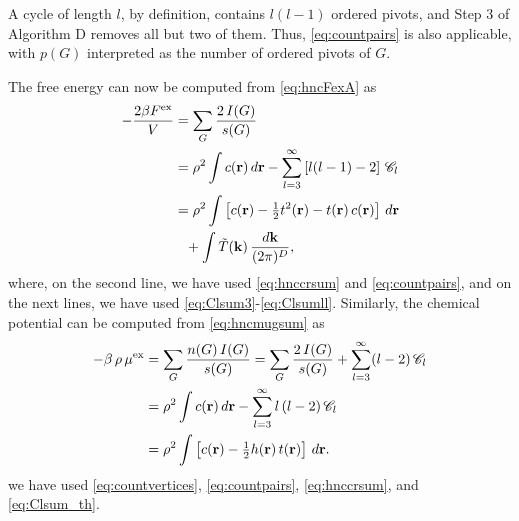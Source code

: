 \documentclass[preprint]{revtex4-1}
\newcommand{\vct}[1]{\mathbf{#1}}
\providecommand{\vr}{} %
\renewcommand{\vr}{\vct{r}}
\newcommand{\vk}{\vct{k}}
\newcommand{\dvk}{\frac{d\vk}{(2\pi)^D}}
\newcommand{\supex}[1]{ { { #1 }^{ \mathrm{ex} } } }
\newcommand{\Fex}{\supex{F}}
\newcommand{\muex}{\supex{\mu}}
\newcommand{\Chn}{\mathscr{C}}
\newcommand{\A}{\mathcal{A}}
\begin{document}
A cycle of length $l$, by definition,
  contains $l (l - 1)$ ordered pivots,
  and Step 3 of Algorithm D
  removes all but two of them.
%
Thus, \eqref{eq:countpairs}
  is also applicable, with $p(G)$ interpreted
  as the number of ordered pivots of $G$.



The free energy can now be computed from \eqref{eq:hncFexA}
as\cite{morita1958, *morita1960, *morita1960I, singer1985}
%
\begin{align}
    - \frac{ 2 \beta \Fex } { V }
  &=
      \sum_G \frac{ 2 \, I(G) } { s(G) }
      \notag \\
  &=
      \rho^2 \int c(\vr) \, d\vr
    - \sum_{l = 3}^\infty \left[ l(l-1) - 2 \right] \, \Chn_l
      \notag \\
  &=
      \rho^2 \int \left[ c(\vr) - \tfrac{1}{2} t^2(\vr) - t(\vr) \, c(\vr) \right] \, d\vr
      \notag \\
  & \hphantom{=}
      + \int  \tilde{T}(\vk) \, \dvk,
\label{eq:hncF}
\end{align}
%
where,
  on the second line,
  we have used \eqref{eq:hnccrsum} and \eqref{eq:countpairs},
  and on the next lines,
  we have used \eqref{eq:Clsum3}-\eqref{eq:Clsumll}.
%
Similarly, the chemical potential
  can be computed from \eqref{eq:hncmugsum}
  as \cite{morita1958, *morita1960, *morita1960I, singer1985}
%
\begin{align}
    - \beta \, \rho \, \muex
  &=
      \sum_G \frac{ n(G) \, I(G) } { s(G) }
  =
      \sum_G \frac{ 2 \, I(G) } { s(G) }
    + \sum_{l = 3}^\infty (l-2) \, \Chn_l
      \notag \\
  &=
      \rho^2 \int c(\vr) \, d\vr
    - \sum_{l = 3}^\infty l \, (l-2) \, \Chn_l
      \notag \\
  &=
      \rho^2 \int \left[ c(\vr) - \tfrac{1}{2} h(\vr) \, t(\vr) \right] \, d\vr.
\label{eq:hncmu}
\end{align}
%
we have used \eqref{eq:countvertices}, \eqref{eq:countpairs},
\eqref{eq:hnccrsum}, and \eqref{eq:Clsum_th}.
\end{document}
